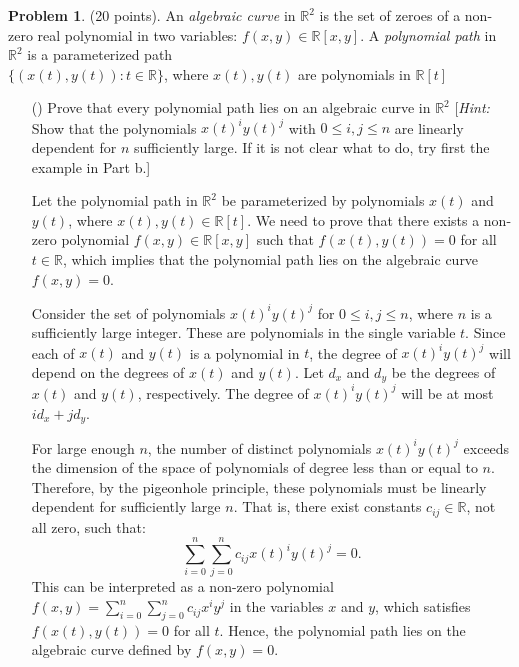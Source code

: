 \documentclass[12pt]{article}
\theoremstyle{definition}
\newtheorem{problem}{Problem}
\newcounter{subq}[problem]
\newenvironment{subproblem}
{\refstepcounter{subq} \begin{itemize} \item[(\alph{subq})]}
{\end{itemize} \medskip}
\begin{document}
\begin{problem} (20 points).
    An \textit{algebraic curve} in $\mathbb{R}^2$ is the set of zeroes of a non-zero real polynomial in two variables: $f(x, y) \in \mathbb{R}[x, y]$.
    A \textit{polynomial path} in $\mathbb{R}^2$ is a parameterized path\\
    $\{(x(t), y(t)): t \in \mathbb{R}\}$, where $x(t), y(t)$ are polynomials in $\mathbb{R}[t]$

    \begin{subproblem}
        Prove that every polynomial path lies on an algebraic curve in $\mathbb{R}^2$ [\textit{Hint:} Show that the polynomials $x(t)^iy(t)^j$ with 
        $0 \leq i, j \leq n$ are linearly dependent for $n$ sufficiently large. If it is not clear what to do, try first the example in Part b.]
        
        \begin{solution}
            Let the polynomial path in $\mathbb{R}^2$ be parameterized by polynomials $x(t)$ and $y(t)$, where $x(t), y(t) \in \mathbb{R}[t]$. We need to prove that there exists a non-zero polynomial $f(x, y) \in \mathbb{R}[x, y]$ such that $f(x(t), y(t)) = 0$ for all $t \in \mathbb{R}$, which implies that the polynomial path lies on the algebraic curve $f(x, y) = 0$.

            Consider the set of polynomials $x(t)^i y(t)^j$ for $0 \leq i, j \leq n$, where $n$ is a sufficiently large integer. These are polynomials in the single variable $t$. Since each of $x(t)$ and $y(t)$ is a polynomial in $t$, the degree of $x(t)^i y(t)^j$ will depend on the degrees of $x(t)$ and $y(t)$. Let $d_x$ and $d_y$ be the degrees of $x(t)$ and $y(t)$, respectively. The degree of $x(t)^i y(t)^j$ will be at most $i d_x + j d_y$.

            For large enough $n$, the number of distinct polynomials $x(t)^i y(t)^j$ exceeds the dimension of the space of polynomials of degree less than or equal to $n$. Therefore, by the pigeonhole principle, these polynomials must be linearly dependent for sufficiently large $n$. That is, there exist constants $c_{ij} \in \mathbb{R}$, not all zero, such that:
            \[
            \sum_{i=0}^n \sum_{j=0}^n c_{ij} x(t)^i y(t)^j = 0.
            \]
            This can be interpreted as a non-zero polynomial $f(x, y) = \sum_{i=0}^n \sum_{j=0}^n c_{ij} x^i y^j$ in the variables $x$ and $y$, which satisfies $f(x(t), y(t)) = 0$ for all $t$. Hence, the polynomial path lies on the algebraic curve defined by $f(x, y) = 0$.
        \end{solution}
    \end{subproblem}


\end{problem}
\end{document}
